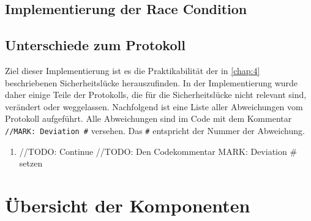 \subsection{Implementierung der Race Condition}


\subsection{Unterschiede zum Protokoll}
Ziel dieser Implementierung ist es die Praktikabilität der in \cref{chap:4} beschriebenen Sicherheitslücke herauszufinden.
In der Implementierung wurde daher einige Teile der Protokolls, die für die Sicherheitslücke nicht relevant sind, verändert oder weggelassen.
Nachfolgend ist eine Liste aller Abweichungen vom Protokoll aufgeführt.
Alle Abweichungen sind im Code mit dem Kommentar \lstinline{//MARK: Deviation #} versehen.
Das \lstinline{#} entspricht der Nummer der Abweichung.

\begin{enumerate}
\item //TODO: Continue
//TODO: Den Codekommentar MARK: Deviation \# setzen
\end{enumerate}

\section{Übersicht der Komponenten}
